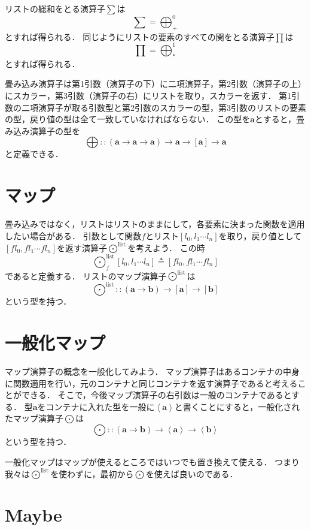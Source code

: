 \documentclass[twocolumn]{jsbook}
\newcommand{\foldfunc}{\bigoplus}
\newcommand{\mapfunc}{\bigodot}
\newcommand{\typename}[1]{\bm{#1}}
\newcommand{\generalcontainer}[1]{\left\langle#1\right\rangle}
\newcommand{\listtype}[1]{\left[#1\right]}
\begin{document}
リストの総和をとる演算子$\sum$は$$\sum=\foldfunc_+^0$$とすれば得られる．
同じようにリストの要素のすべての関をとる演算子$\prod$は$$\prod=\foldfunc_\ast^1$$とすれば得られる．

畳み込み演算子は第1引数（演算子の下）に二項演算子，第2引数（演算子の上）にスカラー，第3引数（演算子の右）にリストを取り，スカラーを返す．
第1引数の二項演算子が取る引数型と第2引数のスカラーの型，第3引数のリストの要素の型，戻り値の型は全て一致していなければならない．
この型を$\typename{a}$とすると，畳み込み演算子の型を$$\foldfunc::(\typename{a}\rightarrow\typename{a}\rightarrow\typename{a})\rightarrow\typename{a}\rightarrow\listtype{\typename{a}}\rightarrow\typename{a}$$と定義できる．


\section{マップ}

畳み込みではなく，リストはリストのままにして，各要素に決まった関数を適用したい場合がある．
引数として関数$f$とリスト$[l_0,l_1\dotsb l_n]$を取り，戻り値として$[fl_0,fl_1\dotsb fl_n]$を返す演算子$\mapfunc^\text{list}$を考えよう．
この時$$\mapfunc_f^\text{list}[l_0,l_1\dotsb l_n]\triangleq [fl_0,fl_1\dotsb fl_n]$$であると定義する．
リストのマップ演算子$\mapfunc^\text{list}$は$$\mapfunc^\text{list}::(\typename{a}\rightarrow\typename{b})\rightarrow\listtype{\typename{a}}\rightarrow\listtype{\typename{b}}$$という型を持つ．


\section{一般化マップ}

マップ演算子の概念を一般化してみよう．
マップ演算子はあるコンテナの中身に関数適用を行い，元のコンテナと同じコンテナを返す演算子であると考えることができる．
そこで，今後マップ演算子の右引数は一般のコンテナであるとする．
型$\typename{a}$をコンテナに入れた型を一般に$\generalcontainer{\typename{a}}$と書くことにすると，一般化されたマップ演算子$\mapfunc$は$$\mapfunc::(\typename{a}\rightarrow\typename{b})\rightarrow\generalcontainer{\typename{a}}\rightarrow\generalcontainer{\typename{b}}$$という型を持つ．

一般化マップはマップが使えるところではいつでも置き換えて使える．
つまり我々は$\mapfunc^\text{list}$を使わずに，最初から$\mapfunc$を使えば良いのである．

\section{Maybe}
\end{document}
